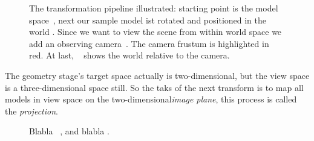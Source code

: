 \begin{figure}[t]
{  \label{fig:subfigviewspace}
}
\caption[Model, World and View space]{The transformation pipeline
illustrated: starting point is the model space~,
next our sample model ist rotated and positioned in the world
. Since we want to view the scene from within world
space we add an observing camera~. The
camera frustum is highlighted in red. At last, ~
shows the world relative to the camera.}
\label{fig:ModelWorldView}
\end{figure}

The geometry stage's target space actually is two-dimensional, but the view
space is a three-dimensional space still. So the taks of the next transform
is to map all models in view space on the two-dimensional\textit{image plane},
this process is called the \textit{projection}.

\begin{figure}
\centering
{}
\caption[View frustum, canonical cube]{Blabla ~,
and blabla .}
\label{fig:ViewToNDC}
\end{figure}

